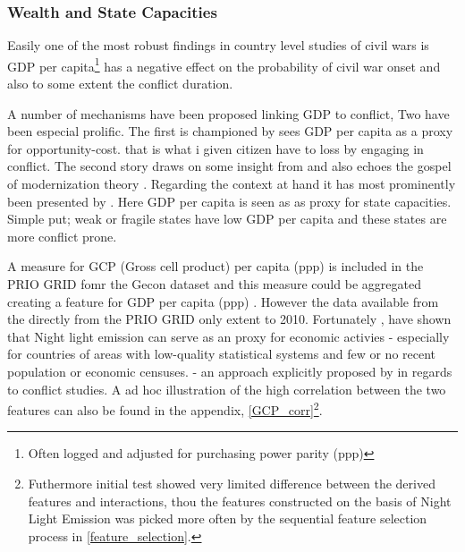 \documentclass[a4paper]{article}
\begin{document}
\subsubsection{Wealth and State Capacities}

 Easily one of the most robust findings in country level studies of civil wars is GDP per capita\footnote{Often logged and adjusted for purchasing power parity (ppp)} has a negative effect on the probability of civil war onset \citep{Collier_Hoeffler_1998, Fearon_Laitin_2003, Collier_Hoeffler_2004, Hegre_Sambanis_2006, Blattman_Miguel_2010} and also to some extent the conflict duration\citep{Fearon_2004, Hegre_Oestby_Raleigh_2009}.\par
 
 A number of mechanisms have been proposed linking GDP to conflict, Two have been especial prolific. The first is championed by \cite{Collier_Hoeffler_1998, Collier_Hoeffler_2004} sees GDP per capita as a proxy for opportunity-cost. that is what i given citizen have to loss by engaging in conflict. The second story draws on some insight from \cite{Skocpol_1979} and also echoes the gospel of modernization theory \citep{Lipset_1959}. Regarding the context at hand it has most prominently been presented by \cite{Fearon_Laitin_2003}. Here GDP per capita is seen as as proxy for state capacities. Simple put; weak or fragile states have low GDP per capita and these states are more conflict prone\citep[88]{Fearon_Laitin_2003}.\par
 
 A measure for GCP (Gross cell product) per capita (ppp) is included in the PRIO GRID fomr the Gecon dataset \citep{Nordhaus_2006} and this measure could be aggregated creating a feature for GDP per capita (ppp) \citep{prio_code_2015}. However the data available from the directly from the PRIO GRID only extent to 2010. Fortunately \cite{Elvidge_2009}, \cite{Chen_Nordhuas_2011} have shown that Night light emission can serve as an proxy for economic activies - especially for countries of areas with low-quality statistical systems and few or no recent population or economic censuses. \citep{Chen_Nordhuas_2011} - an approach explicitly proposed by \cite[p. 101]{Cederman_Gleditsch_Buhaug_2013} in regards to conflict studies. A ad hoc illustration of the high correlation between the two features can also be found in the appendix, \autoref{GCP_corr}\footnote{Futhermore initial test showed very limited difference between the derived features and interactions, thou the features constructed on the basis of Night Light Emission was picked more often by the sequential feature selection process in \autoref{feature_selection}.}.\par
 
\end{document}
